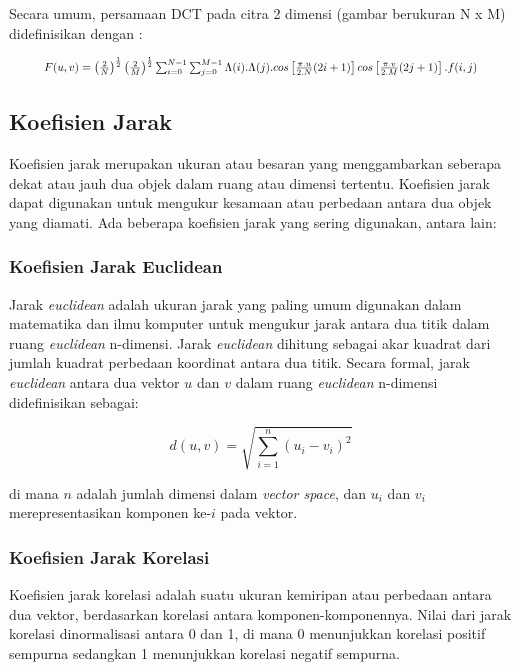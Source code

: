Secara umum, persamaan DCT pada citra 2 dimensi (gambar berukuran N x M) didefinisikan dengan \cite{dct}:

\begin{equation}
	\resizebox{.9\hsize}{!}{$F(u,v) = \left(\frac{2}{N}\right)^{\frac{1}{2}}\left(\frac{2}{M}\right)^{\frac{1}{2}}\sum_{i=0}^{N-1}\sum_{j=0}^{M-1}\Lambda(i).\Lambda(j).cos\left[\frac{\pi.u}{2.N}(2i+1)\right]cos\left[\frac{\pi.v}{2.M}(2j+1) \right].f(i,j)$}
\end{equation}

\subsection{Koefisien Jarak}
Koefisien jarak merupakan ukuran atau besaran yang menggambarkan seberapa dekat atau jauh dua objek dalam ruang atau dimensi tertentu. Koefisien jarak dapat
digunakan untuk mengukur kesamaan atau perbedaan antara dua objek yang diamati. Ada beberapa koefisien jarak yang sering digunakan, antara lain:

\subsubsection{Koefisien Jarak Euclidean}
Jarak \emph{euclidean} adalah ukuran jarak yang paling umum digunakan dalam matematika dan ilmu komputer untuk mengukur jarak antara dua titik dalam ruang \emph{euclidean}
n-dimensi. Jarak \emph{euclidean} dihitung sebagai akar kuadrat dari jumlah kuadrat perbedaan koordinat antara dua titik. Secara formal, jarak \emph{euclidean} antara dua
vektor $u$ dan $v$ dalam ruang \emph{euclidean} n-dimensi didefinisikan sebagai:

\begin{equation}
	d(u,v) = \sqrt{\sum_{i=1}^{n}(u_i - v_i)^2}
\end{equation}

\noindent di mana $n$ adalah jumlah dimensi dalam \emph{vector space}, dan $u_i$ dan $v_i$ merepresentasikan komponen ke-$i$ pada vektor.

\subsubsection{Koefisien Jarak Korelasi}
Koefisien jarak korelasi adalah suatu ukuran kemiripan atau perbedaan antara dua vektor, berdasarkan korelasi antara komponen-komponennya. Nilai dari jarak
korelasi dinormalisasi antara 0 dan 1, di mana 0 menunjukkan korelasi positif sempurna sedangkan 1 menunjukkan korelasi negatif sempurna.

